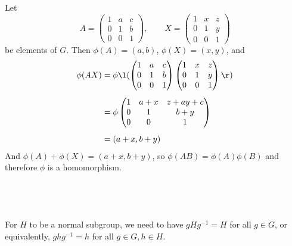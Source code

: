 \documentclass[a4paper]{article}
\begin{document}
Let \[ A = \begin{pmatrix}
    1 & a & c \\
    0 & 1 & b \\
    0 & 0 & 1
\end{pmatrix}, \qquad
X = \begin{pmatrix}
    1 & x & z \\
    0 & 1 & y \\
    0 & 0 & 1
\end{pmatrix}
\] be elements of $G$. Then $\phi(A) = (a, b)$, $\phi(X) = (x, y)$, and
\begin{align*}
\phi(AX) &= \phi \l( \begin{pmatrix}
    1 & a & c \\
    0 & 1 & b \\
    0 & 0 & 1
\end{pmatrix}
\begin{pmatrix}
    1 & x & z \\
    0 & 1 & y \\
    0 & 0 & 1
\end{pmatrix} \r) \\[1ex]
&= \phi \begin{pmatrix}
    1 & a + x & z + ay + c \\
    0 & 1 & b + y \\
    0 & 0 & 1
\end{pmatrix} \\[1ex]
&= (a + x, b + y)%
\end{align*}
And $\phi(A) + \phi(X) = (a + x, b + y)$, so $\phi(AB) = \phi(A)\phi(B)$ and therefore $\phi$ is a homomorphism.

\subsection{~} %

For $H$ to be a normal subgroup, we need to have $gHg^{-1} = H$ for all $g \in G$, or equivalently, $ghg^{-1} = h$ for all $g \in G, h \in H$.
\end{document}
